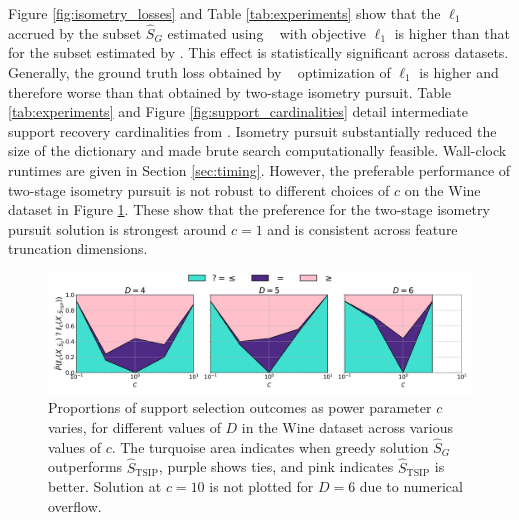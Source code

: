 Figure \ref{fig:isometry_losses} and Table \ref{tab:experiments} show that the $\ell_1$ accrued by the subset $\widehat S_{G}$ estimated using \greedy~ with objective $\ell_1$ is higher than that for the subset estimated by \tsip.
This effect is statistically significant across datasets.
Generally, the ground truth loss obtained by \greedy~ optimization of $\ell_1$ is higher and therefore worse than that obtained by two-stage isometry pursuit.
Table \ref{tab:experiments}  and Figure \ref{fig:support_cardinalities} detail intermediate support recovery cardinalities from \isometrypursuit.
Isometry pursuit substantially reduced the size of the dictionary and made brute search computationally feasible.
Wall-clock runtimes are given in Section \ref{sec:timing}.
However, the preferable performance of two-stage isometry pursuit is not robust to different choices of $c$ on the Wine dataset in Figure \ref{fig:stacked_power_comparison}.
These show that the preference for the two-stage isometry pursuit solution is strongest around $c=1$ and is consistent across feature truncation dimensions.

\clearpage

\begin{figure}[t!]
    \centering
    \includegraphics[width=\textwidth]{../figures/grid_power_comparison_filled.png}
    \caption{
        Proportions of support selection outcomes as power parameter $c$ varies, for different values of $D$ in the Wine dataset across various values of $c$.
        The turquoise area indicates when greedy solution  $\widehat{S}_G$ outperforms $\widehat{S}_{\text{TSIP}}$, purple shows ties, and pink indicates $\widehat{S}_{\text{TSIP}}$ is better.
        Solution at $c=10$ is not plotted for $D=6$ due to numerical overflow.
    }
    \label{fig:stacked_power_comparison}
\end{figure}



